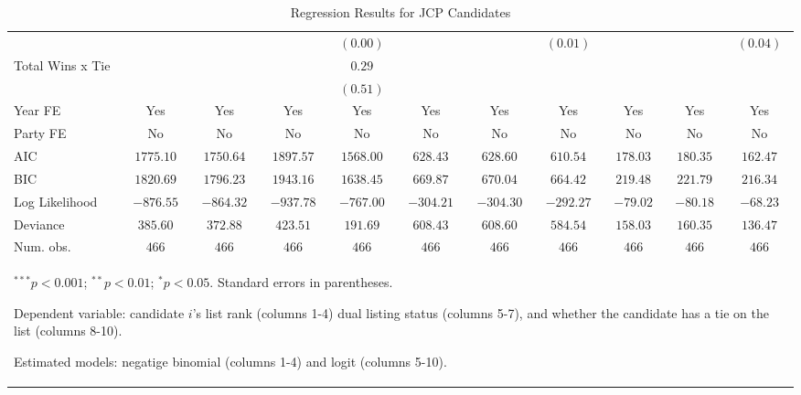 \begin{table}
\begin{center}
\begin{tabular}{l c c c c c c c c c c}
                 &               &               &           & $(0.00)$      &           &           & $(0.01)$     &             &             & $(0.04)$     \\
Total Wins x Tie &               &               &           & $0.29$        &           &           &              &             &             &              \\
                 &               &               &           & $(0.51)$      &           &           &              &             &             &              \\
\hline
Year FE          & Yes           & Yes           & Yes       & Yes           & Yes       & Yes       & Yes          & Yes         & Yes         & Yes          \\
Party FE         & No            & No            & No        & No            & No        & No        & No           & No          & No          & No           \\
AIC              & $1775.10$     & $1750.64$     & $1897.57$ & $1568.00$     & $628.43$  & $628.60$  & $610.54$     & $178.03$    & $180.35$    & $162.47$     \\
BIC              & $1820.69$     & $1796.23$     & $1943.16$ & $1638.45$     & $669.87$  & $670.04$  & $664.42$     & $219.48$    & $221.79$    & $216.34$     \\
Log Likelihood   & $-876.55$     & $-864.32$     & $-937.78$ & $-767.00$     & $-304.21$ & $-304.30$ & $-292.27$    & $-79.02$    & $-80.18$    & $-68.23$     \\
Deviance         & $385.60$      & $372.88$      & $423.51$  & $191.69$      & $608.43$  & $608.60$  & $584.54$     & $158.03$    & $160.35$    & $136.47$     \\
Num. obs.        & $466$         & $466$         & $466$     & $466$         & $466$     & $466$     & $466$        & $466$       & $466$       & $466$        \\
\hline
\multicolumn{11}{l}{\scriptsize{\item $^{***}p<0.001$; $^{**}p<0.01$; $^{*}p<0.05$. Standard errors in parentheses.
\item Dependent variable: candidate $i$'s list rank (columns 1-4) dual listing status (columns 5-7), and whether the candidate has a tie on the list (columns 8-10).
\item Estimated models: negatige binomial (columns 1-4) and logit (columns 5-10).}}
\end{tabular}
\caption{Regression Results for JCP Candidates}
\label{tab:jcp}
\end{center}
\end{table}
